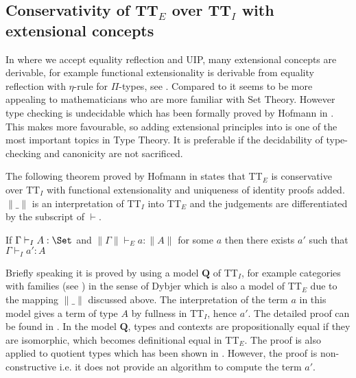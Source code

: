 \subsection{Conservativity of TT$_E$ over TT$_I$ with extensional concepts}

In \ett where we accept equality reflection and UIP, many extensional concepts are derivable, for example functional extensionality is derivable from equality reflection with $\eta$-rule for $\Pi$-types, see . Compared to \itt it seems to be more appealing to mathematicians who are more familiar with Set Theory. However type checking is undecidable which has been formally proved by Hofmann in \cite{hof:phd}. This makes \itt more favourable, so adding extensional principles into \itt  
is one of the most important topics in Type Theory. It is preferable if the decidability of type-checking and canonicity are not sacrificed. 

The following theorem proved by Hofmann in \cite{hof:95:con} states that TT$_E$ is conservative over TT$_I$ with functional extensionality and uniqueness of identity proofs added. $\|\_\|$ is an interpretation of TT$_I$ into TT$_E$ and the judgements are differentiated by the subscript of $\vdash$.

\begin{theorem}
If $\Gamma \vdash_I A : \Set$ and $\| \Gamma \| \vdash_E a : \| A \|$ for some $a$ then there exists $a'$ such that $\Gamma \vdash_I a' : A$
\end{theorem}


Briefly speaking it is proved by using a model $\mathbf{Q}$ of TT$_I$, for example categories with families (see ) in the sense of Dybjer which is also a model of TT$_E$ due to the mapping $\|\_\|$ discussed above. The interpretation of the term $a$ in this model gives a term of type $A$ by fullness in TT$_I$, hence $a'$. The detailed proof can be found in \cite{hof:95:con}. In the model $\mathbf{Q}$, types and contexts are propositionally equal if they are isomorphic, which becomes definitional equal in TT$_E$. The proof is also applied to quotient types which has been shown in \cite{hof:phd}.
However, the proof is non-constructive i.e. it does not provide an algorithm to compute the term $a'$.








